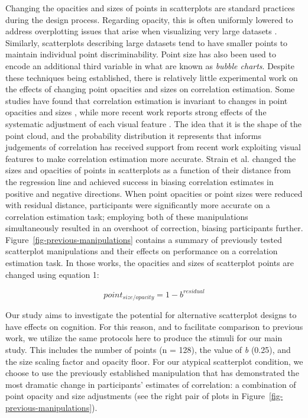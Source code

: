 \documentclass[manuscript,screen,review,anonymous]{acmart}
\begin{document}
Changing the opacities and sizes of points in scatterplots are standard
practices during the design process. Regarding opacity, this is often
uniformly lowered to address overplotting issues that arise when
visualizing very large datasets \citep{matejka_2015}. Similarly,
scatterplots describing large datasets tend to have smaller points to
maintain individual point discriminability. Point size has also been
used to encode an additional third variable in what are known as
\emph{bubble charts}. Despite these techniques being established, there
is relatively little experimental work on the effects of changing point
opacities and sizes on correlation estimation. Some studies have found
that correlation estimation is invariant to changes in point opacities
and sizes \citep{rensink_2014, rensink_2017}, while more recent work
reports strong effects of the systematic adjustment of each visual
feature \citep{strain_2023, strain_2023b, strain_2024}. The idea that it
is the shape of the point cloud, and the probability distribution it
represents that informs judgements of correlation has received support
from recent work exploiting visual features to make correlation
estimation more accurate. Strain et al.
\citep{strain_2023, strain_2023b, strain_2024} changed the sizes and
opacities of points in scatterplots as a function of their distance from
the regression line and achieved success in biasing correlation
estimates in positive and negative directions. When point opacities
\citep{strain_2023} or point sizes \citep{strain_2023b} were reduced
with residual distance, participants were significantly more accurate on
a correlation estimation task; employing both of these manipulations
simultaneously \citep{strain_2024} resulted in an overshoot of
correction, biasing participants further.
Figure~\ref{fig-previous-manipulations} contains a summary of previously
tested scatterplot manipulations and their effects on performance on a
correlation estimation task. In those works, the opacities and sizes of
scatterplot points are changed using equation 1:

\begin{equation}
  point_{size/opacity} = 1 - b^{residual}
\end{equation}

Our study aims to investigate the potential for alternative scatterplot
designs to have effects on cognition. For this reason, and to facilitate
comparison to previous work, we utilize the same protocols here to
produce the stimuli for our main study. This includes the number of
points (n = 128), the value of \emph{b} (0.25), and the size scaling
factor and opacity floor. For our atypical scatterplot condition, we
choose to use the previously established manipulation that has
demonstrated the most dramatic change in participants' estimates of
correlation: a combination of point opacity and size adjustments
\citep{strain_2024} (see the right pair of plots in
Figure~\ref{fig-previous-manipulations}).
\end{document}
